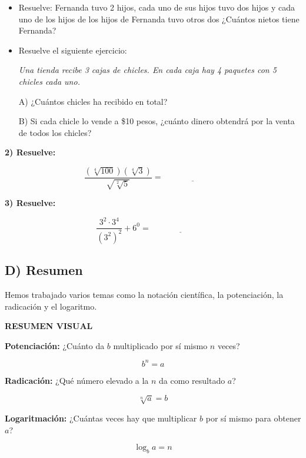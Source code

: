 \documentclass[12pt,a4paper]{article}
\begin{document}
\begin{itemize}
\item Resuelve: Fernanda tuvo 2 hijos, cada uno de sus hijos tuvo dos hijos y cada uno de los hijos de los hijos de Fernanda tuvo otros dos ¿Cuántos nietos tiene Fernanda?

\item Resuelve el siguiente ejercicio:

\textit{Una tienda recibe 3 cajas de chicles. En cada caja hay 4 paquetes con 5 chicles cada uno.}

A) ¿Cuántos chicles ha recibido en total?

B) Si cada chicle lo vende a \$10 pesos, ¿cuánto dinero obtendrá por la venta de todos los chicles?

\end{itemize}

\vspace{0.5cm}

\textbf{2) Resuelve:}

$$\frac{(\sqrt[4]{100})(\sqrt[4]{3})}{\sqrt{\sqrt[2]{5}}} = \underline{\hspace{3cm}}$$

\textbf{3) Resuelve:}

$$\frac{3^2 \cdot 3^4}{(3^2)^2} + 6^0 = \underline{\hspace{3cm}}$$


\subsection*{D) Resumen}

Hemos trabajado varios temas como la notación científica, la potenciación, la radicación y el logaritmo.

\vspace{0.5cm}

\begin{center}
\textbf{RESUMEN VISUAL}
\end{center}

\vspace{0.5cm}

\begin{tcolorbox}[colback=fondoazul,colframe=azuloscuro,title=\textbf{Potenciación, Radicación y Logaritmación},fonttitle=\bfseries,breakable]

\textbf{Potenciación:} ¿Cuánto da $b$ multiplicado por sí mismo $n$ veces?

$$b^n = a$$

\textbf{Radicación:} ¿Qué número elevado a la $n$ da como resultado $a$?

$$\sqrt[n]{a} = b$$

\textbf{Logaritmación:} ¿Cuántas veces hay que multiplicar $b$ por sí mismo para obtener $a$?

$$\log_b a = n$$

\end{tcolorbox}
\end{document}
